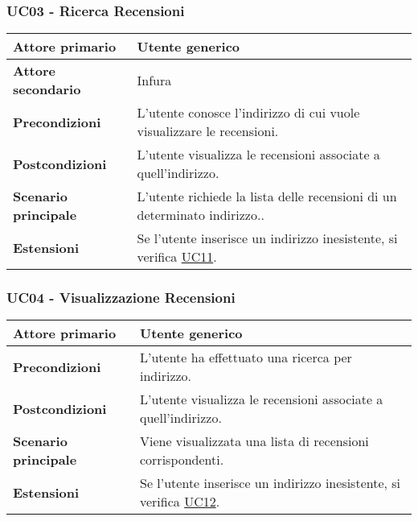 \subsubsection{UC03 - Ricerca Recensioni}
\label{UC03}
\begin{center}
\renewcommand{\arraystretch}{1.5}
\begin{tabular}{ | m{10em} | m{20em} | }
    \hline
    \textbf{Attore primario} & Utente generico \\
    \hline
    \textbf{Attore secondario} & Infura \\
    \hline
    \textbf{Precondizioni} & L'utente conosce l'indirizzo di cui vuole visualizzare le recensioni. \\
    \hline
    \textbf{Postcondizioni} & L'utente visualizza le recensioni associate a quell'indirizzo. \\
    \hline
    \textbf{Scenario principale} & L'utente richiede la lista delle recensioni di un determinato indirizzo.. \\
    \hline
    \textbf{Estensioni} & Se l'utente inserisce un indirizzo inesistente, si verifica \hyperref[UC11]{UC11}. \\
    \hline
   \end{tabular}
\end{center}

\subsubsection{UC04 - Visualizzazione Recensioni}
\label{UC04}
\begin{center}
\renewcommand{\arraystretch}{1.5}
\begin{tabular}{ | m{10em} | m{20em} | }
    \hline
    \textbf{Attore primario} & Utente generico \\
    \hline
    \textbf{Precondizioni} & L'utente ha effettuato una ricerca per indirizzo. \\
    \hline
    \textbf{Postcondizioni} & L'utente visualizza le recensioni associate a quell'indirizzo. \\
    \hline
    \textbf{Scenario principale} & Viene visualizzata una lista di recensioni corrispondenti. \\
    \hline
    \textbf{Estensioni} & Se l'utente inserisce un indirizzo inesistente, si verifica \hyperref[UC12]{UC12}. \\
    \hline
   \end{tabular}
\end{center}

